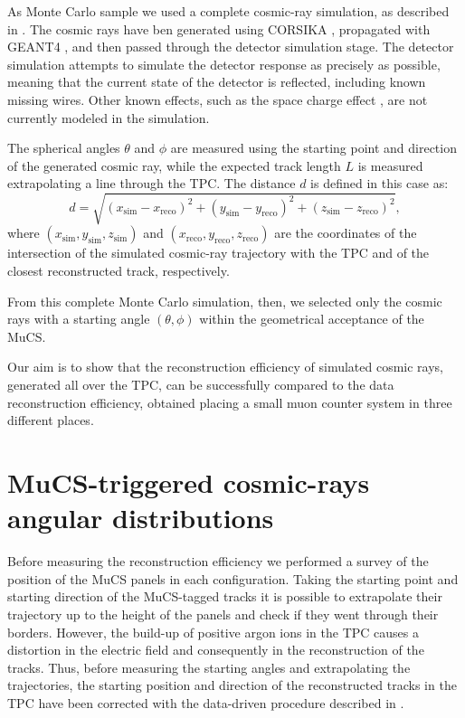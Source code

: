 \documentclass[a4paper]{scrartcl}
\begin{document}
As Monte Carlo sample we used a complete cosmic-ray simulation, as described in \cite{cosmic}. The cosmic rays have ben generated using CORSIKA \cite{corsika},  propagated with GEANT4 \cite{geant}, and then passed through the detector simulation stage. The detector simulation attempts to simulate the detector response as precisely as possible, meaning that the current state of the detector is reflected, including known missing wires. Other known effects, such as the space charge effect \cite{sce}, are not currently modeled in the simulation.

The spherical angles $\theta$ and $\phi$ are measured using the starting point and direction of the generated cosmic ray, while the expected track length $L$ is measured extrapolating a line through the TPC.
The distance $d$ is defined in this case as:
\begin{equation}\label{eq:d_mc}
d = \sqrt{(x_{\mathrm{sim}}-x_{\mathrm{reco}})^2+(y_{\mathrm{sim}}-y_{\mathrm{reco}})^2+(z_{\mathrm{sim}}-z_{\mathrm{reco}})^2},
\end{equation}
where $(x_{\mathrm{sim}},y_{\mathrm{sim}},z_{\mathrm{sim}})$ and $(x_{\mathrm{reco}},y_{\mathrm{reco}},z_{\mathrm{reco}})$ are the coordinates of the intersection of the simulated cosmic-ray trajectory with the TPC and of the closest reconstructed track, respectively.



From this complete Monte Carlo simulation, then, we selected only the cosmic rays with a starting angle $(\theta,\phi)$ within the geometrical acceptance of the MuCS.

Our aim is to show that the reconstruction efficiency of simulated cosmic rays, generated all over the TPC, can be successfully compared to the data reconstruction efficiency, obtained placing a small muon counter system in three different places.

\section{MuCS-triggered cosmic-rays angular distributions}\label{sec:flux}
Before measuring the reconstruction efficiency we performed a survey of the position of the MuCS panels in each configuration. Taking the starting point and starting direction of the MuCS-tagged tracks it is possible to extrapolate their trajectory up to the height of the panels and check if they went through their borders. However, the build-up of positive argon ions in the TPC causes a distortion in the electric field and consequently in the reconstruction of the tracks. Thus, before measuring the starting angles and extrapolating the trajectories, the starting position and direction of the reconstructed tracks in the TPC have been corrected with the data-driven procedure described in \cite{sce}.
\end{document}
